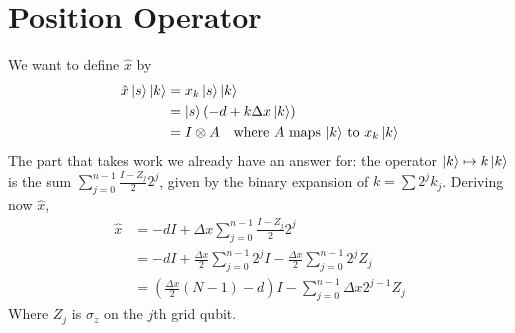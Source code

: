 \documentclass[10pt]{article}
\begin{document}
\section*{Position Operator}
We want to define $\hat{x}$ by 
\begin{align*}
    \hat{x}\ket{s}\ket{k} &= x_k \ket{s} \ket{k} \\
                          &= \ket{s}\left( -d + k \Delta x \ket{k} \right) \\
                          &= I \otimes A \text{\quad where $A$ maps $\ket{k}$ to $x_k \ket{k}$}
\end{align*}
The part that takes work we already have an answer for: the operator $\ket{k} \mapsto k \ket{k}$
is the sum $\sum_{j=0}^{n-1} \frac{I-Z_j}{2}2^j$, given by the binary expansion of $k = \sum 2^j k_j$.
Deriving now $\hat{x}$,
\begin{align*}
    \hat{x} &= -dI + \Delta x \sum_{j=0}^{n-1} \frac{I-Z_j}{2}2^j \\
            &= -dI + \frac{\Delta x}{2} \sum_{j=0}^{n-1}2^j I - \frac{\Delta x}{2} \sum_{j=0}^{n-1}2^j Z_j \\
            &= \left( \frac{\Delta x}{2} \left( N - 1 \right) - d \right)I - \sum_{j=0}^{n-1} \Delta x 2^{j-1} Z_j
\end{align*}
Where $Z_j$ is $\sigma_z$ on the $j$th grid qubit.
\end{document}
